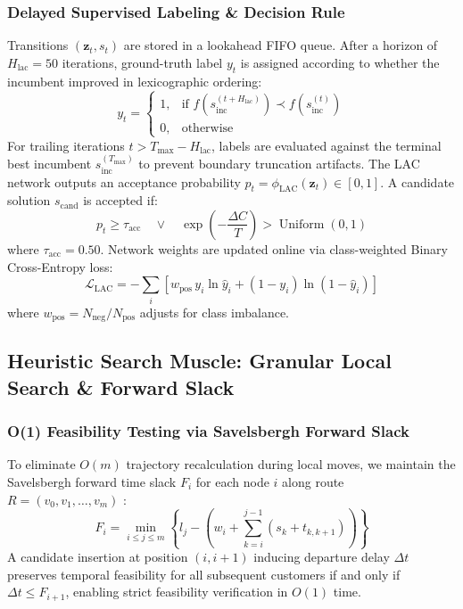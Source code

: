 \documentclass{ieeeaccess}
\begin{document}
\subsubsection{Delayed Supervised Labeling \& Decision Rule}
Transitions $(\mathbf{z}_t, s_t)$ are stored in a lookahead FIFO queue. After a horizon of $H_{\text{lac}} = 50$ iterations, ground-truth label $y_t$ is assigned according to whether the incumbent improved in lexicographic ordering:
\begin{equation}
  y_t = \begin{cases} 1, & \text{if } f(s_{\text{inc}}^{(t + H_{\text{lac}})}) \prec f(s_{\text{inc}}^{(t)}) \\ 0, & \text{otherwise} \end{cases}
  \label{eq:lac_label}
\end{equation}
For trailing iterations $t > T_{\max} - H_{\text{lac}}$, labels are evaluated against the terminal best incumbent $s_{\text{inc}}^{(T_{\max})}$ to prevent boundary truncation artifacts.
The LAC network outputs an acceptance probability $p_t = \phi_{\text{LAC}}(\mathbf{z}_t) \in [0, 1]$. A candidate solution $s_{\text{cand}}$ is accepted if:
\begin{equation}
  p_t \ge \tau_{\text{acc}} \quad \lor \quad \exp\left(-\frac{\Delta C}{T}\right) > \operatorname{Uniform}(0, 1)
  \label{eq:lac_decision_rule}
\end{equation}
where $\tau_{\text{acc}} = 0.50$. Network weights are updated online via class-weighted Binary Cross-Entropy loss:
\begin{equation}
  \mathcal{L}_{\text{LAC}} = -\sum_{i} \left[ w_{\text{pos}}\,y_i \ln \hat{y}_i + (1 - y_i) \ln(1 - \hat{y}_i) \right]
  \label{eq:lac_loss}
\end{equation}
where $w_{\text{pos}} = N_{\text{neg}} / N_{\text{pos}}$ adjusts for class imbalance.

\subsection{Heuristic Search Muscle: Granular Local Search \& Forward Slack}
\label{sec:search_muscle}

\subsubsection{O(1) Feasibility Testing via Savelsbergh Forward Slack}
To eliminate $O(m)$ trajectory recalculation during local moves, we maintain the Savelsbergh forward time slack $F_i$ for each node $i$ along route $R = (v_0, v_1, \dots, v_m)$ \cite{savelsbergh1992general}:
\begin{equation}
  F_i = \min_{i \le j \le m} \left\{ l_j - \left( w_i + \sum_{k=i}^{j-1} (s_k + t_{k, k+1}) \right) \right\}
  \label{eq:forward_slack}
\end{equation}
A candidate insertion at position $(i, i+1)$ inducing departure delay $\Delta t$ preserves temporal feasibility for all subsequent customers if and only if $\Delta t \le F_{i+1}$, enabling strict feasibility verification in $O(1)$ time.
\end{document}
